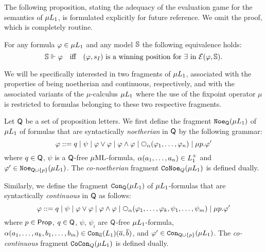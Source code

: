 The following proposition, 
stating the adequacy of the evaluation game for the semantics of $\mu L_{1}$,
is formulated explicitly for future reference.
We omit the proof, which is completely routine.

\begin{fact}[Adequacy]
\label{f:adeqmu}
For any formula $\varphi \in \mu L_{1}$ and any model $\mathbb{S}$ the following 
equivalence holds:
\[
\bbS \mmodels \phi
\quad\text{iff}\quad 
(\phi,s_{I}) \text{ is a winning position for $\eloise$ in } 
\egame(\varphi,\bbS).
\]
\end{fact}

We will be specifically interested in two fragments of $\mu L_{1}$, associated 
with the properties of being noetherian and continuous, respectively, and with 
the associated variants of the $\mu$-calculus $\mu L_{1}$ where the use of the 
fixpoint operator $\mu$ is restricted to formulas belonging to these two
respective fragments.

\begin{definition}
Let $\mathsf{Q}$ be a set  of proposition letters.
We first define the fragment $\mathtt{Noe}_{\mathsf{Q}}(\mu L_{1})$ of $\mu L_{1}$ of 
formulas that are syntactically \emph{noetherian} in $\mathsf{Q}$ by the following 
grammar:
\begin{equation*}
   \varphi \isbnf  q
   \mid \psi
   \mid \varphi \lor \varphi
   \mid \varphi \land \varphi
   \mid \nxt{\al}(\varphi_{1},\ldots,\varphi_{n})
   \mid \mu p.\phi'
\end{equation*}
where $q \in \mathsf{Q}$, $\psi$ is a $\mathsf{Q}$-free $\mu\mathrm{ML}$-formula,
$\alpha(a_{1},\ldots,a_{n}) \in L_{1}^{+}$ and 
$\varphi' \in \mathtt{Noe}_{\mathsf{Q}\cup\{p\}}(\mu L_{1})$. 
The \emph{co-noetherian} fragment $\mathtt{CoNoe}_{Q}(\mu L_{1})$ is defined dually.

Similarly, we define the fragment $\mathtt{Con}_{\mathsf{Q}}(\mu L_{1})$ of 
$\mu L_{1}$-formulas that are syntactically \emph{continuous} in $\mathsf{Q}$ as
follows:
\begin{equation*}
   \varphi \isbnf  q
   \mid \psi
   \mid \varphi \lor \varphi
   \mid \varphi \land \varphi
   \mid 
   \nxt{\al}(\varphi_{1},\ldots,\varphi_{k},\psi_{1},\ldots,\psi_{m})
   \mid \mu p.\phi'
\end{equation*}
where $p\in\mathsf{Prop}$, $q \in \mathsf{Q}$, $\psi$, $\psi_{i}$ are $\mathsf{Q}$-free 
$\mu L_{1}$-formula, $\alpha(a_{1},\ldots,a_{k},b_{1},\ldots,b_{m}) \in 
\mathtt{Con}_{\overline{a}}(L_{1})(\overline{a},\overline{b})$,
and $\varphi' \in \mathtt{Con}_{\mathsf{Q}\cup\{p\}}(\mu L_{1})$. 
The \emph{co-continuous} fragment $\mathtt{CoCon}_{Q}(\mu L_{1})$ is defined dually.
\end{definition}

